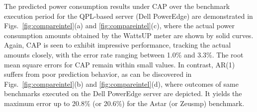 \documentclass[prodmode,acmtaco,pdftex]{acmsmall}
\newcommand{\figurenames}{Figs.}
\begin{document}
The predicted power consumption results under CAP over the benchmark
execution period for the QPL-based server (Dell PowerEdge) are
demonstrated in \figurenames~\ref{fig:compareintel}(a) and
\ref{fig:compareintel}(c), where the actual power consumption amounts
obtained by the WattsUP meter are shown by solid curves.  Again, CAP is
seen to exhibit impressive performance, tracking the actual amounts
closely, with the error rate ranging between 1.0\% and 3.3\%.  The root
mean square errors for CAP remain within small values.  In contrast,
AR(1) suffers from poor prediction behavior, as can be discovered in
\figurenames~\ref{fig:compareintel}(b) and \ref{fig:compareintel}(d),
where outcomes of same benchmarks executed on the Dell PowerEdge server
are depicted.  It yields the maximum error up to 20.8\% (or 20.6\%) for
the Astar (or Zeusmp) benchmark.  
{\addtolength{\tabcolsep}{-3pt}
\begin{table}%
\end{table}}
\end{document}
